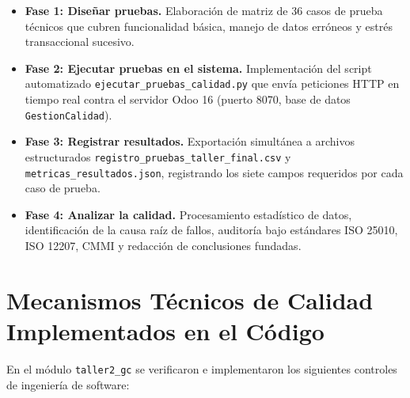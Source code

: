 \documentclass{article}
\newcommand{\checkedbox}{\stackinset{c}{0pt}{c}{0pt}{\checkmark}{$\square$}}
\begin{document}
\begin{itemize}[leftmargin=*]
\item[\checkedbox] \textbf{Fase 1: Diseñar pruebas.} Elaboración de matriz de 36 casos de prueba técnicos que cubren funcionalidad básica, manejo de datos erróneos y estrés transaccional sucesivo.
\item[\checkedbox] \textbf{Fase 2: Ejecutar pruebas en el sistema.} Implementación del script automatizado \texttt{ejecutar\_pruebas\_calidad.py} que envía peticiones HTTP en tiempo real contra el servidor Odoo 16 (puerto 8070, base de datos \texttt{GestionCalidad}).
\item[\checkedbox] \textbf{Fase 3: Registrar resultados.} Exportación simultánea a archivos estructurados \texttt{registro\_pruebas\_taller\_final.csv} y \texttt{metricas\_resultados.json}, registrando los siete campos requeridos por cada caso de prueba.
\item[\checkedbox] \textbf{Fase 4: Analizar la calidad.} Procesamiento estadístico de datos, identificación de la causa raíz de fallos, auditoría bajo estándares ISO 25010, ISO 12207, CMMI y redacción de conclusiones fundadas.
\end{itemize}

\section{Mecanismos Técnicos de Calidad Implementados en el Código}
En el módulo \texttt{taller2\_gc} se verificaron e implementaron los siguientes controles de ingeniería de software:
\end{document}
